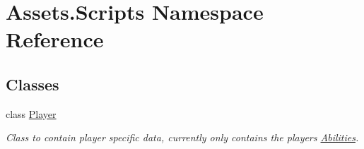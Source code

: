 \hypertarget{namespace_assets_1_1_scripts}{}\section{Assets.\+Scripts Namespace Reference}
\label{namespace_assets_1_1_scripts}
\subsection*{Classes}
\begin{DoxyCompactItemize}
\item 
class \hyperlink{class_assets_1_1_scripts_1_1_player}{Player}
\begin{DoxyCompactList}\small\item\em Class to contain player specific data, currently only contains the player\textquotesingle{}s \hyperlink{class_abilities}{Abilities}. \end{DoxyCompactList}\end{DoxyCompactItemize}
